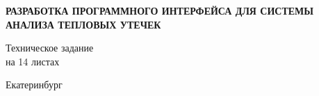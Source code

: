\begin{titlepage}
\begin{center}
	\par \vspace{1cm}
	\begin{Large}
		\textbf{РАЗРАБОТКА ПРОГРАММНОГО ИНТЕРФЕЙСА ДЛЯ СИСТЕМЫ АНАЛИЗА ТЕПЛОВЫХ УТЕЧЕК}
	\end{Large}

	\begin{center}	
			Техническое задание \\
			на 14 листах
	\end{center}







	\par
	\vspace{6cm}

	\noindent Екатеринбург\\
	\\
\end{center}
\end{titlepage}
